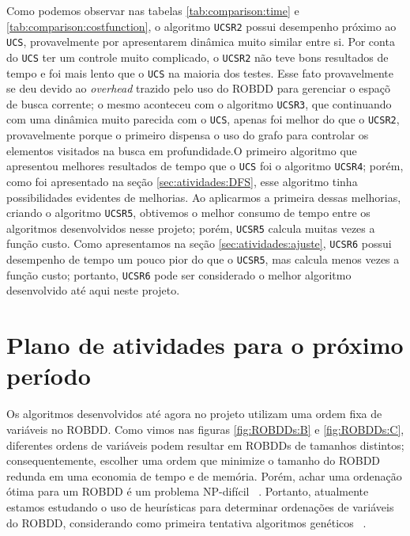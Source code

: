 \documentclass[12pt]{article}
\begin{document}
Como podemos observar nas tabelas \ref{tab:comparison:time} e \ref{tab:comparison:costfunction}, o algoritmo {\tt UCSR2} possui desempenho próximo ao {\tt UCS}, provavelmente por apresentarem dinâmica muito similar entre si. Por conta do {\tt UCS} ter um controle muito complicado, o {\tt UCSR2} não teve bons resultados de tempo e foi mais lento que o {\tt UCS} na maioria dos testes. Esse fato provavelmente se deu devido ao {\em overhead} trazido pelo uso do ROBDD para gerenciar o espaçõ de busca corrente; o mesmo aconteceu com o algoritmo {\tt UCSR3}, que continuando com uma dinâmica muito parecida com o {\tt UCS}, apenas foi melhor do que o {\tt UCSR2}, provavelmente porque o primeiro dispensa o uso do grafo para controlar os elementos visitados na busca em profundidade.O primeiro algoritmo que apresentou melhores resultados de tempo que o {\tt UCS} foi o algoritmo {\tt UCSR4}; porém, como foi apresentado na seção \ref{sec:atividades:DFS}, esse algoritmo tinha possibilidades evidentes de melhorias. Ao aplicarmos a primeira dessas melhorias, criando o algoritmo {\tt UCSR5}, obtivemos o melhor consumo de tempo entre os algoritmos desenvolvidos nesse projeto; porém, {\tt UCSR5} calcula muitas vezes a função custo. Como apresentamos na seção \ref{sec:atividades:ajuste}, {\tt UCSR6} possui desempenho de tempo um pouco pior do que o {\tt UCSR5}, mas calcula menos vezes a função custo; portanto, {\tt UCSR6} pode ser considerado o melhor algoritmo desenvolvido até aqui neste projeto.


\pagebreak

\section{Plano de atividades para o próximo período} \label{sec:plano} %

Os algoritmos desenvolvidos até agora no projeto utilizam uma ordem fixa de variáveis no ROBDD. Como vimos nas figuras \ref{fig:ROBDDs:B} e \ref{fig:ROBDDs:C}, diferentes ordens de variáveis podem resultar em ROBDDs de tamanhos distintos; consequentemente, escolher uma ordem que minimize o tamanho do ROBDD redunda em uma economia de tempo e de memória. Porém, achar uma ordenação ótima para um ROBDD é um problema NP-difícil ~\cite{bollig}. Portanto, atualmente estamos estudando o uso de heurísticas para determinar ordenações de variáveis do ROBDD, considerando como primeira tentativa algoritmos genéticos ~\cite{sanisha, mathew2005}.

\smallskip
\end{document}
